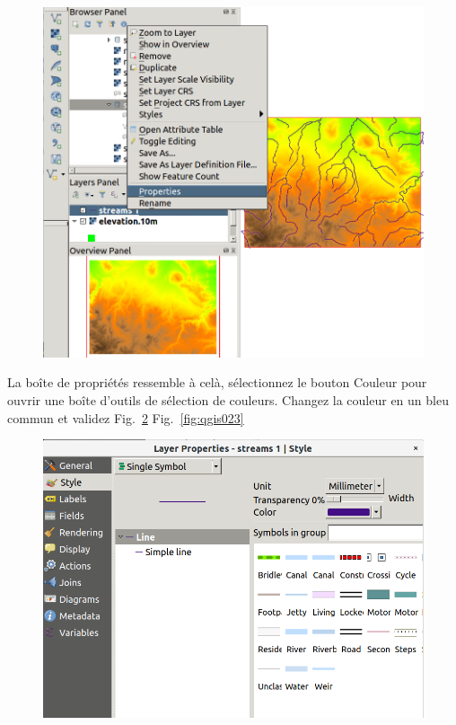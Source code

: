 \begin{figure}[htbp]
   \centering
   \includegraphics[scale=0.25]{qgis021.png}
   \caption{}
   \label{fig:qgis021}
\end{figure}

La bo\^ite de propri\'et\'es ressemble \`a cel\`a, s\'electionnez le bouton Couleur pour ouvrir une bo\^ite d'outils de s\'election de couleurs. Changez la couleur en un bleu commun et validez Fig.~\ref{fig:qgis022} Fig.~\ref{fig:qgis023}

\begin{figure}[htbp]
   \centering
   \includegraphics[scale=0.25]{qgis022.png}
   \caption{}
   \label{fig:qgis022}
\end{figure}

